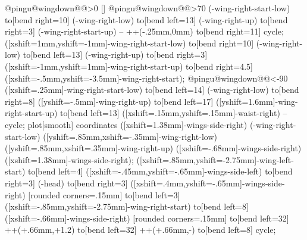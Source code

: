 {        \fi
    \fi
    \edef\@ra{\csname @pingu@wingdown@\@pingu@select@rightwing@ @\endcsname}
    \ifnum\@ra>0 %
        []
        \ifnum\@ra>70
            \pingu@block[left color=\pingu@color@cloak@front,middle color=\pingu@color@cloak@front,right color=\pingu@color@cloak@wings]{\pingu@color@cloak@wings} (\pingu@name-wing-right-start-low) to[bend right=10] (\pingu@name-wing-right-low) to[bend left=13] (\pingu@name-wing-right-up) to[bend right=3] (\pingu@name-wing-right-start-up) -- ++(-.25mm,0mm) to[bend right=11] cycle;
        \else
            \pingu@block[left color=\pingu@color@cloak@front,middle color=\pingu@color@cloak@front,right color=\pingu@color@cloak@wings]{\pingu@color@cloak@wings}  ([xshift=1mm,yshift=-1mm]\pingu@name-wing-right-start-low) to[bend right=10] (\pingu@name-wing-right-low) to[bend left=13] (\pingu@name-wing-right-up) to[bend right=3] ([xshift=-1mm,yshift=1mm]\pingu@name-wing-right-start-up) to[bend right=4.5] ([xshift=-.5mm,yshift=-3.5mm]\pingu@name-wing-right-start);
        \fi
        \endpingu@layer
    \else
        \ifnum\@ra<-90%
            \pingu@block[upper left=\pingu@color@cloak@wings,lower left=\pingu@color@cloak@front,lower right=\pingu@color@cloak@front,upper right=\pingu@color@cloak@front]{\pingu@color@cloak@wings} ([xshift=.25mm]\pingu@name-wing-right-start-low) to[bend left=14] (\pingu@name-wing-right-low) to[bend right=8] ([yshift=-.5mm]\pingu@name-wing-right-up) to[bend left=17] ([yshift=1.6mm]\pingu@name-wing-right-start-up) to[bend left=13] ([xshift=.15mm,yshift=.15mm]\pingu@name-waist-right) -- cycle;
        \else %
            \pingu@block[top color=\pingu@color@cloak@front,middle color=\pingu@color@cloak@front,bottom color=\pingu@color@cloak@wings]{\pingu@color@cloak@wings} plot[smooth] coordinates {([xshift=1.38mm]\pingu@name-wings-side-right) (\pingu@name-wing-right-start-low) ([yshift=.85mm,xshift=-.35mm]\pingu@name-wing-right-low) ([yshift=.85mm,xshift=.35mm]\pingu@name-wing-right-up) ([xshift=-.68mm]\pingu@name-wings-side-right) ([xshift=1.38mm]\pingu@name-wings-side-right)};
        \fi
    \fi
\fi
    \pingu@block[rounded corners=.8mm]{\pingu@color@cloak@cap} ([xshift=.85mm,yshift=-2.75mm]\pingu@name-wing-left-start) to[bend left=4] ([xshift=-.45mm,yshift=-.65mm]\pingu@name-wings-side-left) to[bend right=3]
    (\pingu@name-head)
    to[bend right=3]
    ([xshift=.4mm,yshift=-.65mm]\pingu@name-wings-side-right) [rounded corners=.15mm] to[bend left=3] ([xshift=-.85mm,yshift=-2.75mm]\pingu@name-wing-right-start)
    to[bend left=8]
    ([xshift=-.66mm]\pingu@name-wings-side-right)
    [rounded corners=.15mm]
    to[bend left=32] ++(\pingu@w@half+.66mm,\pingu@w@half+1.2\pingu@one)
    to[bend left=32] ++(\pingu@w@half+.66mm,-\pingu@one)
    to[bend left=8] cycle;
\endscope
}